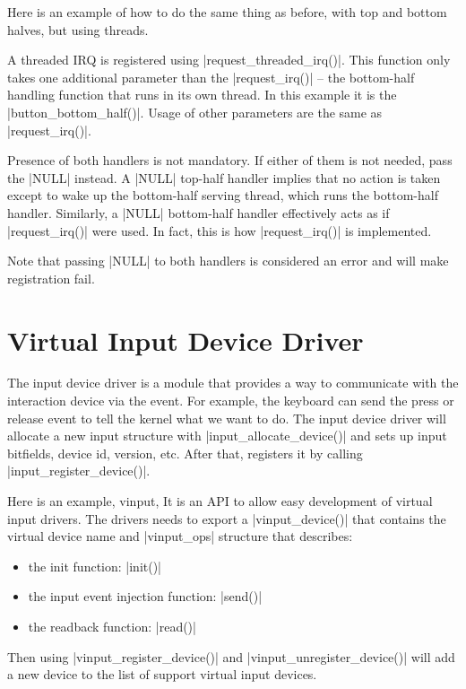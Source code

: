 \documentclass[10pt, oneside]{book}
\begin{document}
Here is an example of how to do the same thing as before, with top and bottom halves, but using threads.


A threaded IRQ is registered using \cpp|request_threaded_irq()|.
This function only takes one additional parameter than the \cpp|request_irq()| -- the bottom-half handling function that runs in its own thread.
In this example it is the \cpp|button_bottom_half()|.
Usage of other parameters are the same as \cpp|request_irq()|.

Presence of both handlers is not mandatory.
If either of them is not needed, pass the \cpp|NULL| instead.
A \cpp|NULL| top-half handler implies that no action is taken except to wake up the bottom-half serving thread, which runs the bottom-half handler.
Similarly, a \cpp|NULL| bottom-half handler effectively acts as if \cpp|request_irq()| were used.
In fact, this is how \cpp|request_irq()| is implemented.

Note that passing \cpp|NULL| to both handlers is considered an error and will make registration fail.

\section{Virtual Input Device Driver}
\label{sec:vinput}
The input device driver is a module that provides a way to communicate with the interaction device via the event.
For example, the keyboard can send the press or release event to tell the kernel what we want to do.
The input device driver will allocate a new input structure with \cpp|input_allocate_device()| and sets up input bitfields, device id, version, etc.
After that, registers it by calling \cpp|input_register_device()|.

Here is an example, vinput,
It is an API to allow easy development of virtual input drivers.
The drivers needs to export a \cpp|vinput_device()| that contains the virtual device name and \cpp|vinput_ops| structure that describes:

\begin{itemize}
    \item the init function: \cpp|init()|
    \item the input event injection function: \cpp|send()|
    \item the readback function: \cpp|read()|
\end{itemize}

Then using \cpp|vinput_register_device()| and \cpp|vinput_unregister_device()| will add a new device to the list of support virtual input devices.
\end{document}
